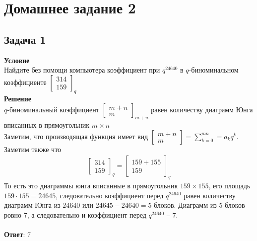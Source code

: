 \newpage		
\section*{Домашнее задание 2}
	\subsection*{Задача 1}
	\noindent
	\textbf{Условие}\\
	Найдите без помощи компьютера коэффициент при $q^{24640}$ в $q$-биноминальном коэффициенте $\left[\begin{array}{c}314 \\ 159\end{array}\right]_{q}$ \\
	\textbf{Решение}\\
	$q$-биноминальный коэффициент $\left[\begin{array}{c}m+n \\ m\end{array}\right]_{m+n}$ равен количеству диаграмм Юнга вписанных в прямоугольник $m\times n$\\
	Заметим, что производящая функция имеет вид $\left[\begin{array}{c}m+n \\ m\end{array}\right] = \sum\limits^{mn}_{k=0} = a_kq^k$.\\
	Заметим также что 
	\begin{gather*}
		\left[\begin{array}{c}314 \\ 159\end{array}\right]_{q} =
		\left[\begin{array}{c}159+155 \\ 159\end{array}\right]_{q}
	\end{gather*}
	То есть это диаграммы юнга вписанные в прямоугольник $159\times155$, его площадь $159 \cdot 155 = 24645$, следовательно коэффициент перед $q^{24640}$ равен количеству диаграмм Юнга из $24640$ или $24645-24640 = 5$ блоков. Диаграмм из $5$ блоков ровно $7$, а следовательно и коэффициент перед $q^{24640}$ -- $7$.\\
	\\
	\textbf{Ответ}: $7$\\
	
	
